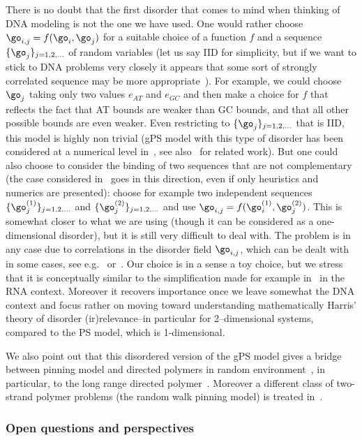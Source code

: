 There is no doubt that the first disorder that comes to mind when thinking of DNA modeling is not the one we have used. One would rather choose $\go_{i,j}=f(\go_i, \go_j)$ for a suitable choice of a function $f$ and a sequence $\{\go_j\}_{j=1,2, \ldots}$ of random variables (let us say IID for simplicity, but if we want to stick to DNA problems very closely it appears that some sort of strongly correlated sequence may be more appropriate~\cite{cf:Peng}). For example, we could choose $\go_j$ taking only two values $e_{AT}$ and $e_{GC}$ and then make a choice for $f$ that reflects the fact that AT bounds are weaker than GC bounds, and that all other possible bounds are even weaker. Even restricting to $\{\go_j\}_{j=1,2, \ldots}$ that is IID, this model is highly non trivial (gPS model with this type of disorder has been considered at a numerical level in~\cite{cf:GOO,cf:GO04}, see also~\cite{cf:EON11,cf:TN08} for related work). But one could also choose to consider the binding of two sequences that are not complementary (the case considered in~\cite{cf:NG06} goes in this direction, even if only heuristics and numerics are presented): choose for example two independent sequences $\{\go^{(1)}_j\}_{j=1,2, \ldots}$ and $\{\go^{(2)}_j\}_{j=1,2, \ldots}$ and use $\go_{i,j}=f(\go^{(1)}_i, \go^{(2)}_j)$. This is somewhat closer to what we are using (though it can be considered as a one-dimensional disorder), but it is still very difficult to deal with. The problem is in any case due to correlations in the disorder field $\go_{i,j}$, which can be dealt with in some cases, see e.g.~\cite{cf:BL12,cf:BP15} or~\cite{cf:AB18, cf:CCP17}. Our choice is in a sense a toy choice, but we stress that it is conceptually similar to the simplification made for example in~\cite{cf:BundHwa} in the RNA context. Moreover it recovers importance once we leave somewhat the DNA context and focus rather on moving toward understanding mathematically Harris' theory of disorder (ir)relevance--in particular for 2--dimensional systems, compared to the PS model, which is 1-dimensional.

We also point out that this disordered version of the gPS model gives a bridge between pinning model and directed polymers in random environment~\cite{cf:Co07,cf:La10}, in particular, to the long range directed polymer~\cite{cf:Co07,cf:We15}. Moreover a different class of two-strand polymer problems (the random walk pinning model) is treated in~\cite{cf:BS1,cf:BS2,cf:BT10}.

\subsubsection{Open questions and perspectives}

